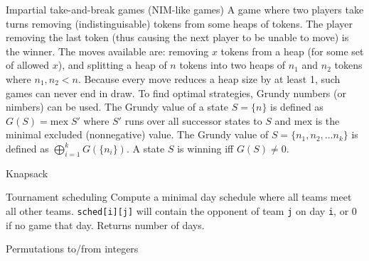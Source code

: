\clearpage
{}
\categorycontents{}



\begin{algorithm}{Impartial take-and-break games (NIM-like games)}
\desc
A game where two players take turns removing (indistinguisable) tokens
from some heaps of tokens.  The player removing the last token (thus
causing the next player to be unable to move) is the winner.  The
moves available are: removing $x$ tokens from a heap (for some set of
allowed $x$), and splitting a heap of $n$ tokens into two heaps of
$n_1$ and $n_2$ tokens where $n_1, n_2 < n$.  Because every move
reduces a heap size by at least 1, such games can never end in draw.
To find optimal strategies, Grundy numbers (or nimbers) can be used.
The Grundy value of a state $S = \{n\}$ is defined as $G(S) =
\mathrm{mex}\;S'$ where $S'$ runs over all successor states to $S$ and
$\mathrm{mex}$ is the minimal excluded (nonnegative) value.  The
Grundy value of $S =
\{n_1, n_2, \ldots n_k\}$ is defined as $\bigoplus_{i=1}^{k}
G(\{n_i\})$.  A state $S$ is winning iff $G(S) \ne 0$.

\end{algorithm}


\begin{algorithm}{Knapsack}
\end{algorithm}



\begin{algorithm}{Tournament scheduling}
\desc
Compute a minimal day schedule where all teams meet all other
teams. {\tt sched[i][j]} will contain the opponent of team {\tt j} on
day {\tt i}, or 0 if no game that day.  Returns number of days.
\end{algorithm}


\begin{algorithm}{Permutations to/from integers}
\end{algorithm}



